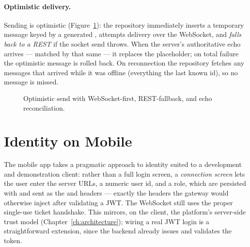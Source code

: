 \paragraph{Optimistic delivery.} Sending is optimistic
(Figure~\ref{fig:mob-send}): the repository immediately inserts a temporary
message keyed by a generated , attempts delivery over the
WebSocket, and \emph{falls back to a REST } if the socket send throws.
When the server's authoritative echo arrives --- matched by that same
 --- it replaces the placeholder; on total failure the
optimistic message is rolled back. On reconnection the repository fetches any
messages that arrived while it was offline (everything  the last known
id), so no message is missed.

\begin{figure}[htbp]
\centering
{}
\caption{Optimistic send with WebSocket-first, REST-fallback, and echo
reconciliation.}
\label{fig:mob-send}
\end{figure}

\section{Identity on Mobile}

The mobile app takes a pragmatic approach to identity suited to a development and
demonstration client: rather than a full login screen, a \emph{connection screen}
lets the user enter the server URLs, a numeric user id, and a role, which are
persisted with  and sent as the  and
 headers --- exactly the headers the gateway would otherwise
inject after validating a JWT. The WebSocket still uses the proper single-use
ticket handshake. This mirrors, on the client, the platform's server-side trust
model (Chapter~\ref{ch:architecture}); wiring a real JWT login is a
straightforward extension, since the backend already issues and validates the
token.

